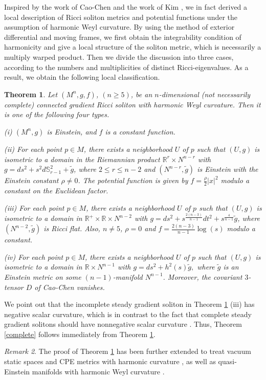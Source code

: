 \documentclass{amsart}
\newtheorem{theorem}{Theorem}[section]
\theoremstyle{definition}
\theoremstyle{remark}
\newtheorem{remark}[theorem]{Remark}
\numberwithin{equation}{section}
\begin{document}
Inspired by the work of Cao-Chen \cite{CC1, CC2} and the work of Kim \cite{Kim}, we in fact derived a local description of Ricci soliton metrics and potential functions under the assumption of harmonic Weyl curvature. By using the method of exterior differential and moving frames, we first obtain the integrability condition of harmonicity and give a local structure of the soliton metric, which is necessarily a multiply warped product. Then we divide the discussion into three cases, according to the numbers and multiplicities of distinct Ricci-eigenvalues. As a result, we obtain the following local classification. 

\begin{theorem} \label{local}
	Let $(M^n, g, f)$, $(n\geq 5)$, be an $n$-dimensional (not necessarily complete) connected gradient Ricci soliton with harmonic Weyl curvature. Then it is one of the following four types.
	
	\smallskip
	{\rm (i)} $(M^n, g)$ is Einstein, and $f$ is a constant function.
	
	\smallskip
	{\rm (ii)} For each point $p \in M$, there exists a neighborhood $U$ of $p$ such that $(U, g)$ is isometric to a domain in the Riemannian product $\mathbb{R}^{r}\times N^{n-r}$ with $g= ds^2 + s^2d\mathbb{S}^2_{r-1}+\tilde{g} $,
	where $2 \leq r\leq n-2$ and $\left(N^{n-r}, \tilde{g}\right)$ is Einstein with the Einstein constant $\rho\neq 0$.
	The potential function is given by $f = \frac{\rho}{2} |x|^2$ modulo a constant on the Euclidean factor.
	
	\smallskip
	{\rm (iii)} For each point $p \in M$, there exists a neighborhood $U$ of $p$ 
	such that $(U,g)$ is isometric to a domain in 
	$\mathbb{R^+}\times\mathbb{R} \times N^{n-2}$ 
	with 
	$g=ds^2 + s^{\frac{2(n-3)}{n-1}} dt^2+ s^{\frac{4}{n-1}} \tilde{g}$,  
	where $\left( N^{n-2}, \tilde{g}\right) $ is Ricci flat. 
	Also, $n\neq5$, $\rho=0$ and $f=\frac{2(n-3)}{n-1} \log (s)$ modulo a constant.
	
	\smallskip
	{\rm (iv)} For each point $p \in M$, 
	there exists a neighborhood $U$ of $p$ 
	such that $(U,g)$ is isometric to a domain in $\mathbb{R} \times N^{n-1}$ 
	with $g= ds^2 + h^2(s) \tilde{g},$
	where $\tilde{g}$ is an Einstein metric  
	on some $(n-1)$-manifold $N^{n-1}$.
	Moreover, the covariant $3$-tensor $D$ of Cao-Chen \cite{CC1, CC2} vanishes.
\end{theorem}


We point out that the incomplete steady gradient soliton in Theorem \ref{local} {\rm (iii)} has negative scalar curvature, which is in contrast to the fact that complete steady gradient solitons should have nonnegative scalar curvature \cite{Ch}. Thus, Theorem \ref{complete} follows immediately from Theorem \ref{local}.
\begin{remark} 
	The proof of Theorem \ref{local} has been further extended to treat vacuum static spaces and CPE metrics with harmonic curvature \cite {F-M-1, CL}, as well as quasi-Einstein manifolds with harmonic Weyl curvature \cite{CLS}.
\end{remark} 
\end{document}
